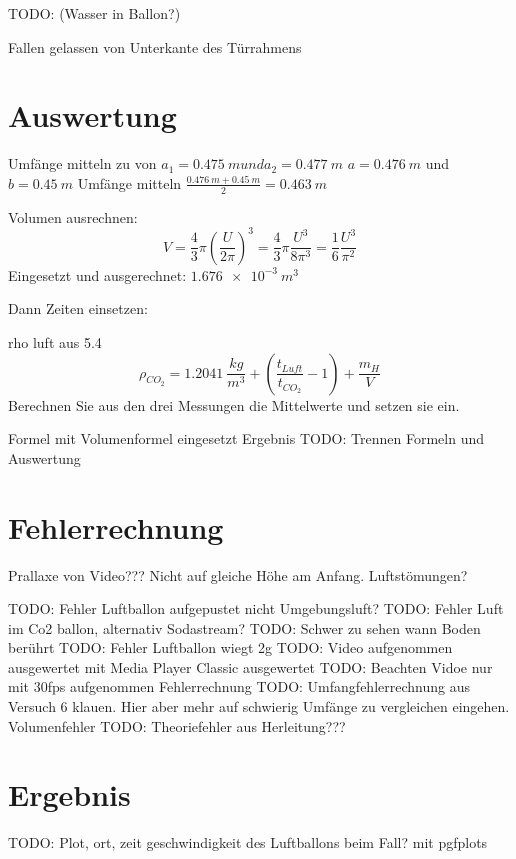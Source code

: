 \documentclass{article}
\begin{document}
    TODO: (Wasser in Ballon?)
    
    Fallen gelassen von Unterkante des Türrahmens
    
    
    \section{Auswertung}
        Umfänge mitteln zu von \(a_1 = \SI{0.475}{m} und a_2 = \SI{0.477}{m} \)
        \(a = \SI{0.476}{m} \) und \(b = \SI{0.45}{m} \)
        Umfänge mitteln \( \frac{ \SI{0.476}{m} + \SI{0.45}{m} }{2} = \SI{0.463}{m} \)

        Volumen ausrechnen:
        \begin{equation} \label{eq:volumen}
            V = \frac{4}{3} \pi {\left( \frac{U}{2 \pi} \right) }^3 = \frac{4}{3} \pi \frac{U^3}{8 \pi^3} = \frac{1}{6} \frac{U^3}{\pi^2}
        \end{equation} %
        Eingesetzt und ausgerechnet:
        \( \SI{1.676e-3}{m^3} \)

        Dann Zeiten einsetzen:

        rho luft aus 5.4
        \begin{equation}
            \rho_{CO_2} = \SI{1.2041}{\frac{kg}{m^3}} + (\frac{t_{Luft}}{t_{CO_2}} - 1)+\frac{m_H}{V}
        \end{equation}
        Berechnen Sie aus den drei Messungen die Mittelwerte und setzen sie ein.

        Formel mit Volumenformel eingesetzt
        Ergebnis
    TODO: Trennen Formeln und Auswertung

    \section{Fehlerrechnung}
        Prallaxe von Video???
        Nicht auf gleiche Höhe am Anfang.
        Luftstömungen?
        
        TODO: Fehler Luftballon aufgepustet nicht Umgebungsluft?
        TODO: Fehler Luft im Co2 ballon, alternativ Sodastream?
        TODO: Schwer zu sehen wann Boden berührt
        TODO: Fehler Luftballon wiegt 2g
        TODO: Video aufgenommen ausgewertet mit Media Player Classic ausgewertet
        TODO: Beachten Vidoe nur mit 30fps aufgenommen Fehlerrechnung
        TODO: Umfangfehlerrechnung aus Versuch 6 klauen. Hier aber mehr auf schwierig Umfänge zu vergleichen eingehen. Volumenfehler
        TODO: Theoriefehler aus Herleitung???

    \section{Ergebnis}
        TODO: Plot, ort, zeit geschwindigkeit des Luftballons beim Fall? mit pgfplots
\end{document}
